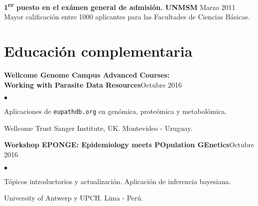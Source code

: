 \documentclass[margin,line]{res}
\newenvironment{list2}{
	\begin{list}{$\bullet$}{%
			\setlength{\itemsep}{0in}
			\setlength{\parsep}{0in} \setlength{\parskip}{0in}
			\setlength{\topsep}{0in} \setlength{\partopsep}{0in}
			\setlength{\leftmargin}{0.2in}}}{\end{list}}
\begin{document}
\begin{resume}
		{\bf 1\textsuperscript{er} puesto en el exámen general de admisión. UNMSM} \hfill Marzo 2011\\
		Mayor calificación entre 1000 aplicantes para las Facultades de Ciencias Básicas.\\

		
		\section{\sc Educación complementaria}
		
		{\bf Wellcome Genome Campus Advanced Courses:\\Working with Parasite Data Resources}\hfill {Octubre 2016}\\
		\vspace*{-.1in}%
		\begin{list2} %
			\item Aplicaciones de \texttt{eupathdb.org} en genómica, proteómica y metabolómica.
			\item Wellcome Trust Sanger Institute, UK. Montevideo - Uruguay.
		\end{list2}
		
		{\bf Workshop EPONGE: Epidemiology meets POpulation GEnetics}\hfill {Octubre 2016}\\
		\vspace*{-.1in}
		\begin{list2} %
			\item Tópicos introductorios y actualización. Aplicación de inferencia bayesiana.
			\item University of Antwerp y UPCH. Lima - Perú.
		\end{list2}


\end{resume}
\end{document}

